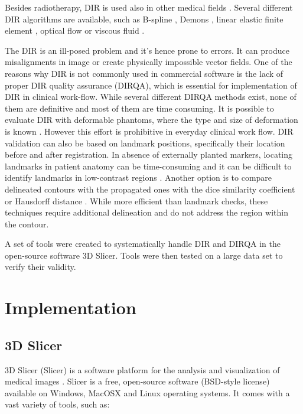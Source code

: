 \documentclass[type=dr, dr=rernat, accentcolor=tud7b,colorbacktitle, bigchapter, openright, twoside, 12pt ]{tudthesis}
\begin{document}
Besides radiotherapy, DIR is used also in other medical fields \cite{Cleary2010, Herrell2012, Nithiananthan2011, Naini2010}.
Several different DIR algorithms are available, such as B-spline \cite{Rueckert1999}, Demons \cite{Thirion1998}, linear elastic finite element \cite{Venugopal2005}, optical flow \cite{Zhong2007} or viscous fluid \cite{Christensen1996}.
	
The DIR is an ill-posed problem and it's hence prone to errors. It can produce misalignments in image or create physically impossible vector fields. 
One of the reasons why DIR is not commonly used in commercial software is the lack of proper DIR quality assurance (DIRQA), which is essential for implementation of DIR in clinical work-flow. While several different DIRQA methods exist, none of them are definitive and most of them are time consuming. 
It is possible to evaluate DIR with deformable phantoms, where the type and size of deformation is known \cite{Kashani2007, Kirby2011}. However this effort is prohibitive 
in everyday clinical work flow. DIR validation can also be based on landmark positions, specifically their location before and after registration. In absence of externally planted markers, locating landmarks in patient 
anatomy can be time-consuming and it can be difficult to identify landmarks in low-contrast regions \cite{Varadhan2013}. Another option is to compare delineated contours with the propagated ones with the dice similarity coefficient \cite{Varadhan2013} or Hausdorff distance \cite{Huttenlocher1993}. 
While more efficient than landmark checks, these techniques require additional delineation and do not address the region within the contour.

A set of tools were created to systematically handle DIR and DIRQA in the open-source software 3D Slicer. Tools were then tested on a large data set to verify their validity.

\section{Implementation}
\label{Implementation}

\subsection{3D Slicer}
\label{Slicer}

3D Slicer (Slicer) is a software platform for the analysis and visualization of medical images \cite{Slicer, Fedorov2012}. Slicer is a free, open-source software (BSD-style license) available on Windows, MacOSX and Linux operating systems. 
It comes with a vast variety of tools, such as:
\end{document}
